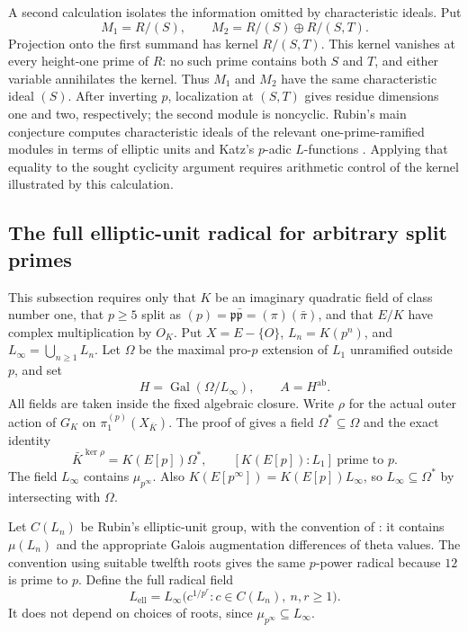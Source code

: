 A second calculation isolates the information omitted by
characteristic ideals. Put
\[
 M_1=R/(S),\qquad
 M_2=R/(S)\oplus R/(S,T).
\]
Projection onto the first summand has kernel \(R/(S,T)\).
This kernel vanishes at every height-one prime of \(R\):
no such prime contains both \(S\) and \(T\), and either variable
annihilates the kernel. Thus \(M_1\) and \(M_2\) have the same
characteristic ideal \((S)\). After inverting \(p\), localization
at \((S,T)\) gives residue dimensions one and two, respectively;
the second module is noncyclic. Rubin's main conjecture computes
characteristic ideals of the relevant one-prime-ramified modules
in terms of elliptic units and Katz's \(p\)-adic \(L\)-functions
\cite{Rubin1991}. Applying that equality to the sought cyclicity
argument requires arithmetic control of the kernel illustrated
by this calculation.

\subsection{The full elliptic-unit radical for arbitrary split primes}
\label{subsec:cm-elliptic-radical}

This subsection requires only that \(K\) be an imaginary quadratic field
of class number one, that \(p\geq5\) split as
\((p)=\mathfrak p\bar{\mathfrak p}=(\pi)(\bar\pi)\), and that
\(E/K\) have complex multiplication by \(O_K\).
Put \(X=E-\{O\}\), \(L_n=K(p^n)\), and
\(L_\infty=\bigcup_{n\geq1}L_n\).
Let \(\Omega\) be the maximal pro-\(p\) extension of \(L_1\)
unramified outside \(p\), and set
\[
 H=\operatorname{Gal}(\Omega/L_\infty),\qquad A=H^{\mathrm{ab}}.
\]
All fields are taken inside the fixed algebraic closure.
Write \(\rho\) for the actual outer action of \(G_K\) on
\(\pi_1^{(p)}(X_{\bar K})\).
The proof of \cite[Lemma 2.13, p.~10]{Ishii} gives a field
\(\Omega^*\subseteq\Omega\) and the exact identity
\begin{equation}\label{eq:cm-radical-outer-field}
 \bar K^{\ker\rho}=K(E[p])\Omega^*,\qquad
 [K(E[p]):L_1]\ \text{prime to }p.
\end{equation}
The field \(L_\infty\) contains \(\mu_{p^\infty}\).
Also \(K(E[p^\infty])=K(E[p])L_\infty\), so
\(L_\infty\subseteq\Omega^*\) by intersecting with \(\Omega\).

Let \(C(L_n)\) be Rubin's elliptic-unit group, with the convention of
\cite[Definition 2.2, p.~8]{IshiiSoule}: it contains \(\mu(L_n)\)
and the appropriate Galois augmentation differences of theta values.
The convention using suitable twelfth roots gives the same
\(p\)-power radical because \(12\) is prime to \(p\).
Define the full radical field
\begin{equation}\label{eq:cm-full-radical}
 L_{\mathrm{ell}}=
 L_\infty\bigl(c^{1/p^r}:c\in C(L_n),\ n,r\geq1\bigr).
\end{equation}
It does not depend on choices of roots, since
\(\mu_{p^\infty}\subseteq L_\infty\).

